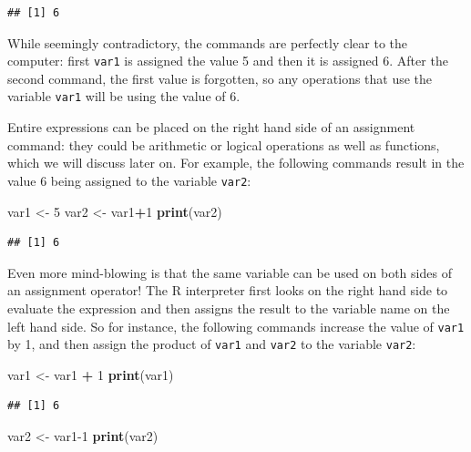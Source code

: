 \documentclass[
]{book}
\newenvironment{Shaded}{\begin{snugshade}}{\end{snugshade}}
\newcommand{\DecValTok}[1]{\textcolor[rgb]{0.00,0.00,0.81}{#1}}
\newcommand{\KeywordTok}[1]{\textcolor[rgb]{0.13,0.29,0.53}{\textbf{#1}}}
\newcommand{\NormalTok}[1]{#1}
\newcommand{\OperatorTok}[1]{\textcolor[rgb]{0.81,0.36,0.00}{\textbf{#1}}}
\newcommand{\StringTok}[1]{\textcolor[rgb]{0.31,0.60,0.02}{#1}}
\theoremstyle{definition}
\theoremstyle{definition}
\theoremstyle{definition}
\theoremstyle{remark}
\begin{document}
\begin{verbatim}
## [1] 6
\end{verbatim}

While seemingly contradictory, the commands are perfectly clear to the computer: first \texttt{var1} is assigned the value 5 and then it is assigned 6. After the second command, the first value is forgotten, so any operations that use the variable \texttt{var1} will be using the value of 6.

Entire expressions can be placed on the right hand side of an assignment command: they could be arithmetic or logical operations as well as functions, which we will discuss later on. For example, the following commands result in the value 6 being assigned to the variable \texttt{var2}:

\begin{Shaded}
\begin{Highlighting}[]
\NormalTok{var1 \textless{}{-}}\StringTok{ }\DecValTok{5}
\NormalTok{var2 \textless{}{-}}\StringTok{ }\NormalTok{var1}\OperatorTok{+}\DecValTok{1}
\KeywordTok{print}\NormalTok{(var2)}
\end{Highlighting}
\end{Shaded}

\begin{verbatim}
## [1] 6
\end{verbatim}

Even more mind-blowing is that the same variable can be used on both sides of an assignment operator! The R interpreter first looks on the right hand side to evaluate the expression and then assigns the result to the variable name on the left hand side. So for instance, the following commands increase the value of \texttt{var1} by 1, and then assign the product of \texttt{var1} and \texttt{var2} to the variable \texttt{var2}:

\begin{Shaded}
\begin{Highlighting}[]
\NormalTok{var1 \textless{}{-}}\StringTok{ }\NormalTok{var1 }\OperatorTok{+}\StringTok{ }\DecValTok{1}
\KeywordTok{print}\NormalTok{(var1)}
\end{Highlighting}
\end{Shaded}

\begin{verbatim}
## [1] 6
\end{verbatim}

\begin{Shaded}
\begin{Highlighting}[]
\NormalTok{var2 \textless{}{-}}\StringTok{ }\NormalTok{var1}\DecValTok{{-}1}
\KeywordTok{print}\NormalTok{(var2)}
\end{Highlighting}
\end{Shaded}
\end{document}
